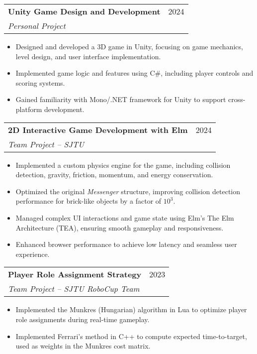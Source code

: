 \documentclass[letterpaper,11pt]{article}
\makeatletter
\newcommand{\resumeItem}[1]{\item\small{
  {#1 \vspace{-2pt}}
}}
\newcommand{\resumeSubheading}[4]{
  \vspace{-1pt}\item
  \begin{tabular*}{\textwidth}[t]{l@{\extracolsep{\fill}}r}
    \textbf{#1} & #2 \\
    \textit{\small#3} & \textit{\small #4} \\
  \end{tabular*}\vspace{-5pt}
}
\newcommand{\resumeItemListStart}{\begin{itemize}}
\newcommand{\resumeItemListEnd}{\end{itemize}}
\makeatother
\begin{document}
\resumeSubheading
{Unity Game Design and Development}{2024}
{Personal Project}{}
\resumeItemListStart
\resumeItem{Designed and developed a 3D game in Unity, focusing on game mechanics, level design, and user interface implementation.}
\resumeItem{Implemented game logic and features using C\#, including player controls and scoring systems.}
\resumeItem{Gained familiarity with Mono/.NET framework for Unity to support cross-platform development.}
\resumeItemListEnd



\resumeSubheading
{2D Interactive Game Development with Elm}{2024}
{Team Project – SJTU}{}
\resumeItemListStart
\resumeItem{Implemented a custom physics engine for the game, including collision detection, gravity, friction, momentum, and energy conservation.}
\resumeItem{Optimized the original \textit{Messenger} structure, improving collision detection performance for brick-like objects by a factor of $10^{3}$.}
\resumeItem{Managed complex UI interactions and game state using Elm’s The Elm Architecture (TEA), ensuring smooth gameplay and responsiveness.}
\resumeItem{Enhanced browser performance to achieve low latency and seamless user experience.}
\resumeItemListEnd

\resumeSubheading
{Player Role Assignment Strategy}{2023}
{Team Project – SJTU RoboCup Team}{}
\resumeItemListStart
\resumeItem{Implemented the Munkres (Hungarian) algorithm in Lua to optimize player role assignments during real-time gameplay.}
\resumeItem{Implemented Ferrari’s method in C++ to compute expected time-to-target, used as weights in the Munkres cost matrix.}
\resumeItemListEnd

%
\end{document}
